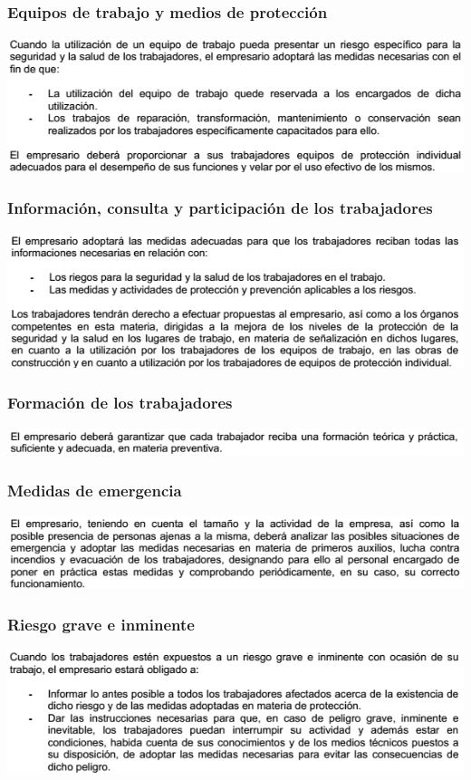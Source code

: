 \subsubsection{Equipos de trabajo y medios de protección}
\includegraphics[width=15cm,keepaspectratio]{Memoria/EBSS/4.png}
\subsubsection{Información, consulta y participación de los trabajadores}
\includegraphics[width=15cm,keepaspectratio]{Memoria/EBSS/5.png}
\subsubsection{Formación de los trabajadores}
\includegraphics[width=15cm,keepaspectratio]{Memoria/EBSS/6.png}
\subsubsection{Medidas de emergencia}
\includegraphics[width=15cm,keepaspectratio]{Memoria/EBSS/7.png}
\subsubsection{Riesgo grave e inminente}
\includegraphics[width=15cm,keepaspectratio]{Memoria/EBSS/8.png}

